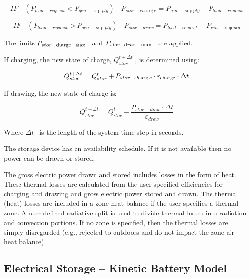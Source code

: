\begin{equation}
IF\quad ({P_{load - request}} < {P_{gen - \sup ply}})\quad {P_{stor - ch\arg e}} = {P_{gen - \sup ply}} - {P_{load - request}}
\end{equation}

\begin{equation}
IF\quad ({P_{load - request}} > {P_{gen - \sup ply}})\quad {P_{stor - draw}} = {P_{load - request}} - {P_{gen - \sup ply}}
\end{equation}

The limits \({P_{stor - {\rm{charge - max}}}}\) ~and \({P_{stor - {\rm{d}}raw{\rm{ - max}}}}\) ~are applied.

If charging, the new state of charge, \(Q_{stor}^{t + \Delta t}\) , is determined using:

\begin{equation}
Q_{stor}^{t + \Delta t} = Q_{stor}^t + {P_{stor - ch\arg e}} \cdot {\varepsilon_{{\rm{charge}}}} \cdot \Delta t
\end{equation}

If drawing, the new state of charge is:

\begin{equation}
Q_{stor}^{t + \Delta t} = Q_{stor}^t - \frac{{{P_{stor - draw}} \cdot \Delta t}}{{{\varepsilon_{draw}}}}
\end{equation}

Where \(\Delta t\) ~is the length of the system time step in seconds.

The storage device has an availability schedule. If it is not available then no power can be drawn or stored.

The gross electric power drawn and stored includes losses in the form of heat. These thermal losses are calculated from the user-specified efficiencies for charging and drawing and gross electric power stored and drawn. The thermal (heat) losses are included in a zone heat balance if the user specifies a thermal zone. A user-defined radiative split is used to divide thermal losses into radiation and convection portions. If no zone is specified, then the thermal losses are simply disregarded (e.g., rejected to outdoors and do not impact the zone air heat balance).

\subsection{Electrical Storage -- Kinetic Battery Model}\label{electrical-storage-kinetic-battery-model}

